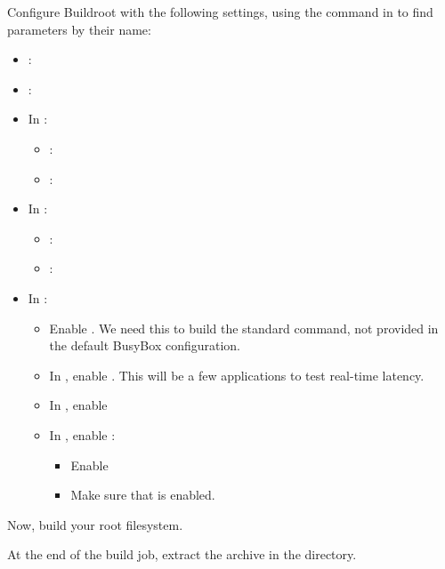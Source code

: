 Configure Buildroot with the following settings, using the \code{/}
command in  to find parameters by their name:

\begin{itemize}
\item {}:  
\item {}: 
\item In :
   \begin{itemize}
   \item {}: 
   \item {}: 
   \end{itemize}
\item In : 
   \begin{itemize}
   \item {}: 
   \item {}: 
   \end{itemize}
\item In :
   \begin{itemize}
   \item Enable .
         We need this to build the standard  command, not
         provided in the default BusyBox configuration.
   \item In , enable
         . This will be a few applications to test
         real-time latency.
   \item In , enable 
   \item In , enable :
         \begin{itemize}
         \item Enable 
	 \item Make sure that  is enabled.
  	 \end{itemize}
   \end{itemize}
\end{itemize}

Now, build your root filesystem.

At the end of the build job, extract the
 archive in the 
directory.

